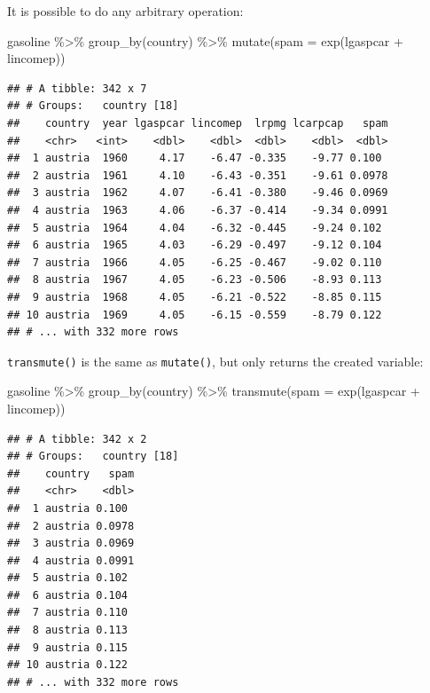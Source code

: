 \documentclass[
]{article}
\newenvironment{Shaded}{\begin{snugshade}}{\end{snugshade}}
\newcommand{\AttributeTok}[1]{\textcolor[rgb]{0.77,0.63,0.00}{#1}}
\newcommand{\FunctionTok}[1]{\textcolor[rgb]{0.00,0.00,0.00}{#1}}
\newcommand{\NormalTok}[1]{#1}
\newcommand{\SpecialCharTok}[1]{\textcolor[rgb]{0.00,0.00,0.00}{#1}}
\begin{document}
It is possible to do any arbitrary operation:

\begin{Shaded}
\begin{Highlighting}[]
\NormalTok{gasoline }\SpecialCharTok{\%\textgreater{}\%}
  \FunctionTok{group\_by}\NormalTok{(country) }\SpecialCharTok{\%\textgreater{}\%}
  \FunctionTok{mutate}\NormalTok{(}\AttributeTok{spam =} \FunctionTok{exp}\NormalTok{(lgaspcar }\SpecialCharTok{+}\NormalTok{ lincomep))}
\end{Highlighting}
\end{Shaded}

\begin{verbatim}
## # A tibble: 342 x 7
## # Groups:   country [18]
##    country  year lgaspcar lincomep  lrpmg lcarpcap   spam
##    <chr>   <int>    <dbl>    <dbl>  <dbl>    <dbl>  <dbl>
##  1 austria  1960     4.17    -6.47 -0.335    -9.77 0.100 
##  2 austria  1961     4.10    -6.43 -0.351    -9.61 0.0978
##  3 austria  1962     4.07    -6.41 -0.380    -9.46 0.0969
##  4 austria  1963     4.06    -6.37 -0.414    -9.34 0.0991
##  5 austria  1964     4.04    -6.32 -0.445    -9.24 0.102 
##  6 austria  1965     4.03    -6.29 -0.497    -9.12 0.104 
##  7 austria  1966     4.05    -6.25 -0.467    -9.02 0.110 
##  8 austria  1967     4.05    -6.23 -0.506    -8.93 0.113 
##  9 austria  1968     4.05    -6.21 -0.522    -8.85 0.115 
## 10 austria  1969     4.05    -6.15 -0.559    -8.79 0.122 
## # ... with 332 more rows
\end{verbatim}

\texttt{transmute()} is the same as \texttt{mutate()}, but only returns the created variable:

\begin{Shaded}
\begin{Highlighting}[]
\NormalTok{gasoline }\SpecialCharTok{\%\textgreater{}\%}
  \FunctionTok{group\_by}\NormalTok{(country) }\SpecialCharTok{\%\textgreater{}\%}
  \FunctionTok{transmute}\NormalTok{(}\AttributeTok{spam =} \FunctionTok{exp}\NormalTok{(lgaspcar }\SpecialCharTok{+}\NormalTok{ lincomep))}
\end{Highlighting}
\end{Shaded}

\begin{verbatim}
## # A tibble: 342 x 2
## # Groups:   country [18]
##    country   spam
##    <chr>    <dbl>
##  1 austria 0.100 
##  2 austria 0.0978
##  3 austria 0.0969
##  4 austria 0.0991
##  5 austria 0.102 
##  6 austria 0.104 
##  7 austria 0.110 
##  8 austria 0.113 
##  9 austria 0.115 
## 10 austria 0.122 
## # ... with 332 more rows
\end{verbatim}
\end{document}
